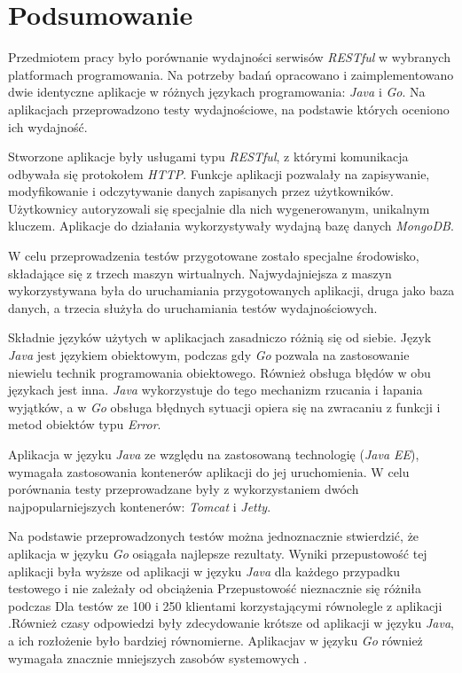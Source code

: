 \chapter{Podsumowanie}

Przedmiotem pracy było porównanie wydajności serwisów \textsl{RESTful} w wybranych platformach programowania. Na potrzeby badań opracowano i zaimplementowano dwie identyczne aplikacje w różnych językach programowania: \textsl{Java} i \textsl{Go}. Na aplikacjach przeprowadzono testy wydajnościowe, na podstawie których oceniono ich wydajność.

Stworzone aplikacje były usługami typu \textsl{RESTful}, z którymi komunikacja odbywała się protokołem \textsl{HTTP}. Funkcje aplikacji pozwalały na zapisywanie, modyfikowanie i odczytywanie danych  zapisanych przez użytkowników. Użytkownicy autoryzowali się specjalnie dla nich wygenerowanym, unikalnym kluczem. Aplikacje do działania wykorzystywały wydajną bazę danych \textsl{MongoDB}.

W celu przeprowadzenia testów przygotowane zostało specjalne środowisko, składające się z trzech maszyn wirtualnych. Najwydajniejsza z maszyn wykorzystywana była do uruchamiania przygotowanych aplikacji, druga jako baza danych, a  trzecia  służyła do uruchamiania testów wydajnościowych.

Składnie języków użytych w aplikacjach zasadniczo różnią się od siebie. Język \textsl{Java} jest językiem obiektowym, podczas gdy \textsl{Go} pozwala na zastosowanie niewielu technik programowania obiektowego. Również obsługa błędów w obu językach jest inna. \textsl{Java} wykorzystuje do tego mechanizm rzucania i łapania wyjątków, a w \textsl{Go} obsługa błędnych sytuacji opiera się na zwracaniu z funkcji i metod obiektów typu \textsl{Error}.

Aplikacja w języku \textsl{Java} ze względu na zastosowaną technologię (\textsl{Java EE}), wymagała zastosowania kontenerów aplikacji do jej uruchomienia. W celu porównania testy przeprowadzane były z wykorzystaniem dwóch najpopularniejszych kontenerów: \textsl{Tomcat} i \textsl{Jetty}. 

Na podstawie  przeprowadzonych testów można jednoznacznie stwierdzić, że aplikacja w języku \textsl{Go} osiągała najlepsze rezultaty. Wyniki przepustowość tej aplikacji  była wyższe od aplikacji w języku \textsl{Java} dla każdego przypadku testowego i nie zależały od obciążenia  Przepustowość nieznacznie się różniła podczas Dla testów ze 100  i 250 klientami korzystającymi równolegle z aplikacji .Również czasy odpowiedzi były zdecydowanie krótsze od aplikacji w języku \textsl{Java}, a ich rozłożenie było bardziej równomierne. Aplikacjav w języku \textsl{Go} również wymagała znacznie mniejszych zasobów systemowych .

